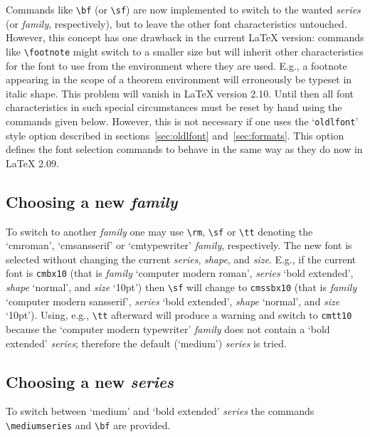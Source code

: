  
 Commands like \verb+\bf+ (or \verb+\sf+) are now implemented to
 switch to the wanted {\em series\/} (or {\em family}, respectively),
 but to leave
 the other font characteristics untouched.  However, this concept has
 one drawback in the current \LaTeX{} version: commands like
 \verb+\footnote+ might switch to a smaller size but will inherit
 other characteristics for the font to use from the environment where
 they are used.  E.g., a footnote appearing in the scope of a theorem
 environment will erroneously be typeset in italic shape.  This
 problem will vanish in \LaTeX{} version 2.10.  Until then all font
 characteristics in such special circumstances must be reset by hand
 using the commands given below.  However, this is not necessary if
 one uses the `{\tt oldlfont}' style option described in
 sections~\ref{sec:oldlfont} and~\ref{sec:formats}.
 This option defines the font selection
 commands to behave in the same way as they do now in \LaTeX{} 2.09.
 
 
 \subsection{Choosing a new {\em family}}
 
 To switch to another {\em family\/} one may use \verb+\rm+,
 \verb+\sf+ or \verb+\tt+ denoting the `cmroman', `cmsansserif' or
 `cmtypewriter' {\em family}, respectively.  The new font is selected
 without changing the current {\em series}, {\em shape}, and {\em
 size}.  E.g., if the current font is {\tt cmbx10} (that is {\em
 family\/} `computer modern roman', {\em series\/} `bold extended',
 {\em shape\/} `normal', and {\em size\/} `10pt') then \verb+\sf+ will
 change to {\tt cmssbx10} (that is {\em family\/} `computer modern
 sansserif', {\em series\/} `bold extended', {\em shape\/} `normal', and
 {\em size\/} `10pt').  Using, e.g., \verb+\tt+ afterward will
 produce a warning and switch to {\tt cmtt10} because the `computer
 modern typewriter' {\em family\/} does not contain a `bold extended'
 {\em series}; therefore the default (`medium') {\em series\/} is tried.
 
 \subsection{Choosing a new {\em series}}
 
 To switch between `medium' and `bold extended' {\em series\/} the
 commands \verb+\mediumseries+ and \verb+\bf+ are provided.
 
